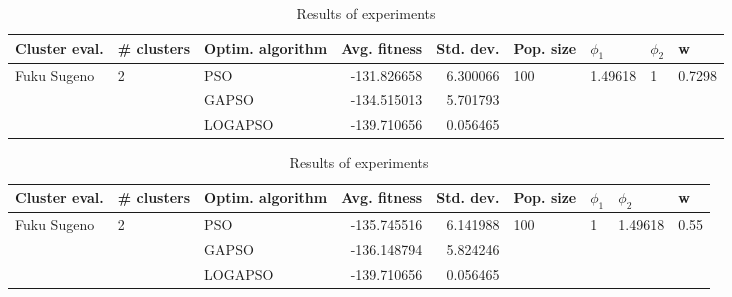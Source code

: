 \documentclass{article}
\begin{document}
\begin{table}
\centering
\caption{Results of experiments}
\begin{tabular}{lllrrllll}
\toprule
               Cluster eval. &        \# clusters & Optim. algorithm &  Avg. fitness &  Std. dev. &            Pop. size &               $\phi_{1}$ &         $\phi_{2}$ &                       w \\
\midrule
\multirow{3}{*}{Fuku Sugeno} & \multirow{3}{*}{2} &              PSO &   -131.826658 &   6.300066 & \multirow{3}{*}{100} & \multirow{3}{*}{1.49618} & \multirow{3}{*}{1} & \multirow{3}{*}{0.7298} \\
                             &                    &            GAPSO &   -134.515013 &   5.701793 &                      &                          &                    &                         \\
                             &                    &          LOGAPSO &   -139.710656 &   0.056465 &                      &                          &                    &                         \\
\bottomrule
\end{tabular}
\end{table}
\begin{table}
\centering
\caption{Results of experiments}
\begin{tabular}{lllrrllll}
\toprule
               Cluster eval. &        \# clusters & Optim. algorithm &  Avg. fitness &  Std. dev. &            Pop. size &         $\phi_{1}$ &               $\phi_{2}$ &                     w \\
\midrule
\multirow{3}{*}{Fuku Sugeno} & \multirow{3}{*}{2} &              PSO &   -135.745516 &   6.141988 & \multirow{3}{*}{100} & \multirow{3}{*}{1} & \multirow{3}{*}{1.49618} & \multirow{3}{*}{0.55} \\
                             &                    &            GAPSO &   -136.148794 &   5.824246 &                      &                    &                          &                       \\
                             &                    &          LOGAPSO &   -139.710656 &   0.056465 &                      &                    &                          &                       \\
\bottomrule
\end{tabular}
\end{table}
\end{document}
